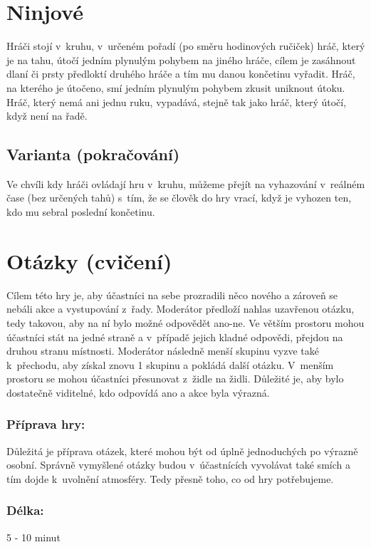  
 
\needspace{5cm} \section{Ninjové} \label{ninjové} Hráči stojí v~kruhu, v~určeném pořadí (po směru hodinových ručiček) hráč, který je na tahu, útočí jedním plynulým pohybem na jiného hráče, cílem je zasáhnout dlaní či prsty předloktí druhého hráče a tím mu danou končetinu vyřadit. Hráč, na kterého je útočeno, smí jedním plynulým pohybem zkusit uniknout útoku. 
Hráč, který nemá ani jednu ruku, vypadává, stejně tak jako hráč, který útočí, když není na řadě. 
 
\subsection{Varianta (pokračování) } Ve chvíli kdy hráči ovládají hru v~kruhu, můžeme přejít na vyhazování v~reálném čase (bez určených tahů) s~tím, že se člověk do hry vrací, když je vyhozen ten, kdo mu sebral poslední končetinu.  
 
 
\needspace{5cm} \section{Otázky (cvičení)} \label{otázky (cvičení)} Cílem této  hry je, aby účastníci na sebe prozradili něco nového a zároveň se nebáli akce a vystupování z~řady. Moderátor předloží nahlas uzavřenou otázku, tedy takovou, aby na ní bylo možné odpovědět ano-ne. Ve větším prostoru mohou účastníci stát na jedné straně a v~případě jejich kladné odpovědi, přejdou na druhou stranu místnosti. Moderátor následně menší skupinu vyzve také k~přechodu, aby získal znovu 1 skupinu a pokládá další otázku. V~menším prostoru se mohou účastníci přesunovat z~židle na židli. Důležité je, aby bylo dostatečně viditelné, kdo odpovídá ano a akce byla výrazná. 
 
\subsubsection{Příprava hry:} Důležitá je příprava otázek, které mohou být od úplně jednoduchých po výrazně osobní. Správně vymyšlené otázky budou v~účastnících vyvolávat také smích a tím dojde k~uvolnění atmosféry. Tedy přesně toho, co od hry potřebujeme. 
 
\subsubsection{Délka:} 5 - 10 minut 
 
